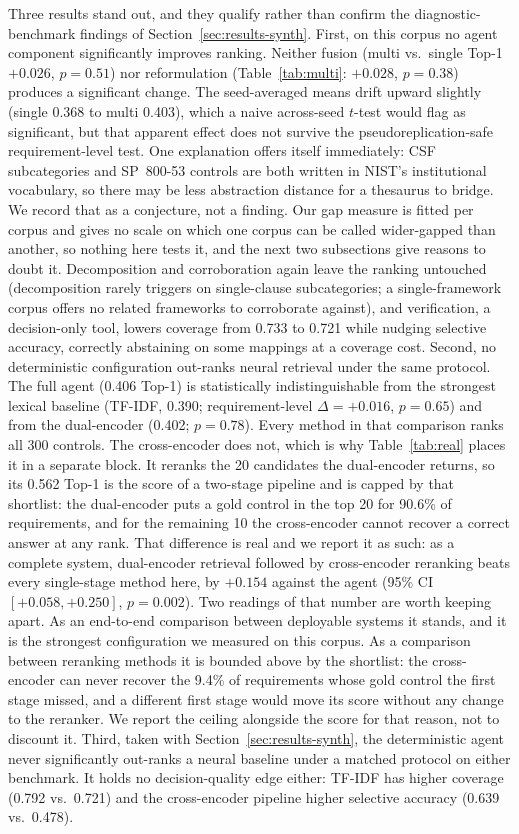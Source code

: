 \documentclass[smallextended,natbib]{svjour3}
\begin{document}
Three results stand out, and they qualify rather than confirm the diagnostic-benchmark findings of Section~\ref{sec:results-synth}.
First, on this corpus no agent component significantly improves ranking.
Neither fusion (multi vs.\ single Top-1 $+0.026$, $p = 0.51$) nor reformulation (Table~\ref{tab:multi}: $+0.028$, $p = 0.38$) produces a significant change.
The seed-averaged means drift upward slightly (single 0.368 to multi 0.403), which a naive across-seed $t$-test would flag as significant, but that apparent effect does not survive the pseudoreplication-safe requirement-level test.
One explanation offers itself immediately: CSF subcategories and SP~800-53 controls are both written in NIST's institutional vocabulary, so there may be less abstraction distance for a thesaurus to bridge.
We record that as a conjecture, not a finding. Our gap measure is fitted per corpus and gives no scale on which one corpus can be called wider-gapped than another, so nothing here tests it, and the next two subsections give reasons to doubt it.
Decomposition and corroboration again leave the ranking untouched (decomposition rarely triggers on single-clause subcategories; a single-framework corpus offers no related frameworks to corroborate against), and verification, a decision-only tool, lowers coverage from 0.733 to 0.721 while nudging selective accuracy, correctly abstaining on some mappings at a coverage cost.
Second, no deterministic configuration out-ranks neural retrieval under the same protocol.
The full agent (0.406 Top-1) is statistically indistinguishable from the strongest lexical baseline (TF-IDF, 0.390; requirement-level $\Delta=+0.016$, $p=0.65$) and from the dual-encoder (0.402; $p=0.78$).
Every method in that comparison ranks all 300 controls.
The cross-encoder does not, which is why Table~\ref{tab:real} places it in a separate block.
It reranks the 20 candidates the dual-encoder returns, so its 0.562 Top-1 is the score of a two-stage pipeline and is capped by that shortlist: the dual-encoder puts a gold control in the top 20 for 90.6\% of requirements, and for the remaining 10 the cross-encoder cannot recover a correct answer at any rank.
That difference is real and we report it as such: as a complete system, dual-encoder retrieval followed by cross-encoder reranking beats every single-stage method here, by $+0.154$ against the agent (95\% CI $[+0.058, +0.250]$, $p=0.002$).
Two readings of that number are worth keeping apart. As an end-to-end comparison between deployable systems it stands, and it is the strongest configuration we measured on this corpus. As a comparison between reranking methods it is bounded above by the shortlist: the cross-encoder can never recover the 9.4\% of requirements whose gold control the first stage missed, and a different first stage would move its score without any change to the reranker. We report the ceiling alongside the score for that reason, not to discount it.
Third, taken with Section~\ref{sec:results-synth}, the deterministic agent never significantly out-ranks a neural baseline under a matched protocol on either benchmark.
It holds no decision-quality edge either: TF-IDF has higher coverage (0.792 vs.\ 0.721) and the cross-encoder pipeline higher selective accuracy (0.639 vs.\ 0.478).
\end{document}
